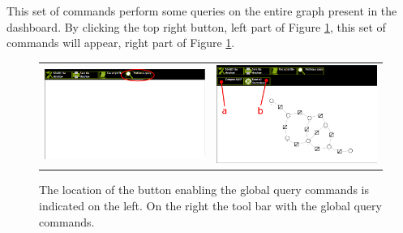 This set of commands perform some queries on the entire graph present in the dashboard. By clicking the top right button, left part of Figure \ref{fig:global_query}, this set of commands will appear, right part of Figure \ref{fig:global_query}.

\begin{figure}
	\centering
\begin{tabular}{ll}
\begin{minipage}[t]{0.49\textwidth}
	\includegraphics[width= \columnwidth]{../src/Chapter_additional/04_EFG_GUI/image/img_03.png}
\end{minipage}
 &
\begin{minipage}[t]{0.49\textwidth}
	\includegraphics[width= \columnwidth]{../src/Chapter_additional/04_EFG_GUI/image/img_04.png}
\end{minipage}
\end{tabular}
	\caption{The location of the button enabling the global query commands is indicated on the left. On the right the tool bar with the global query commands.}
	\label{fig:global_query}
\end{figure}

